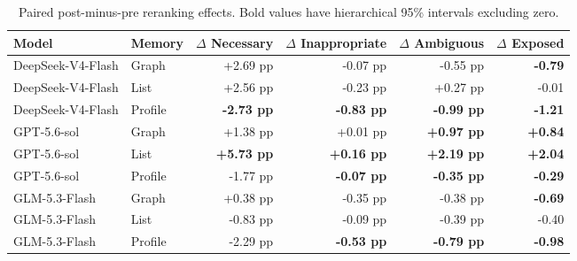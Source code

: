 \begin{table}[t]
\centering
\small
\begin{tabular}{llrrrr}
\toprule
Model & Memory & $\Delta$ Necessary & $\Delta$ Inappropriate & $\Delta$ Ambiguous & $\Delta$ Exposed \\
\midrule
DeepSeek-V4-Flash & Graph & +2.69 pp & -0.07 pp & -0.55 pp & \textbf{-0.79} \\
DeepSeek-V4-Flash & List & +2.56 pp & -0.23 pp & +0.27 pp & -0.01 \\
DeepSeek-V4-Flash & Profile & \textbf{-2.73 pp} & \textbf{-0.83 pp} & \textbf{-0.99 pp} & \textbf{-1.21} \\
GPT-5.6-sol & Graph & +1.38 pp & +0.01 pp & \textbf{+0.97 pp} & \textbf{+0.84} \\
GPT-5.6-sol & List & \textbf{+5.73 pp} & \textbf{+0.16 pp} & \textbf{+2.19 pp} & \textbf{+2.04} \\
GPT-5.6-sol & Profile & -1.77 pp & \textbf{-0.07 pp} & \textbf{-0.35 pp} & \textbf{-0.29} \\
GLM-5.3-Flash & Graph & +0.38 pp & -0.35 pp & -0.38 pp & \textbf{-0.69} \\
GLM-5.3-Flash & List & -0.83 pp & -0.09 pp & -0.39 pp & -0.40 \\
GLM-5.3-Flash & Profile & -2.29 pp & \textbf{-0.53 pp} & \textbf{-0.79 pp} & \textbf{-0.98} \\
\bottomrule
\end{tabular}
\caption{Paired post-minus-pre reranking effects. Bold values have hierarchical 95\% intervals excluding zero.}
\label{tab:cimemories-reranking-effects}
\end{table}
